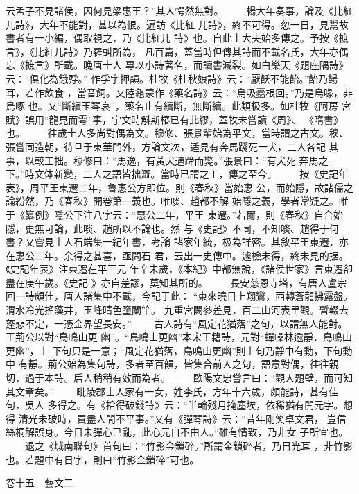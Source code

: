 \documentclass{ctexart}
\begin{document}
云孟子不見諸侯，因何見梁惠王？''其人愕然無對。 　　楊大年奏事，論及《比紅儿詩》，大年不能對，甚以為恨。遍訪《比紅 儿詩》，終不可得。忽一日，見鬻故書者有一小編，偶取視之，乃《比紅儿 詩》也。自此士大夫始多傳之。予按《摭言》，《比紅儿詩》乃羅虯所為， 凡百篇，蓋當時但傳其詩而不載名氏，大年亦偶忘《摭言》所載。晚唐士人 專以小詩著名，而讀書滅裂。如白樂天《題座隅詩》云：``俱化為餓殍。'' 作孚字押韻。杜牧《杜秋娘詩》云：``厭飫不能飴。''飴乃餳耳，若作飲食 ，當音飼。又陸龜蒙作《藥名詩》云：``烏吸蠹根回。''乃是烏喙，非烏啄 也。又``斷續玉琴哀''，藥名止有續斷，無斷續。此類极多。如杜牧《阿房 宮賦》誤用``龍見而雩''事，宇文時斛斯椿已有此繆，蓋牧未嘗讀《周》、 《隋書》也。 　　往歲士人多尚對偶為文。穆修、張景輩始為平文，當時謂之古文。穆、 張嘗同造朝，待旦于東華門外，方論文次，适見有奔馬踐死一犬，二人各記 其事，以較工拙。穆修曰：``馬逸，有黃犬遇蹄而斃。''張景曰：``有犬死 奔馬之下。''時文体新變，二人之語皆拙澀。當時已謂之工，傳之至今。 　　按《史記年表》，周平王東遷二年，魯惠公方即位。則《春秋》當始惠 公，而始隱，故諸儒之論紛然，乃《春秋》開卷第一義也。唯啖、趙都不解 始隱之義，學者常疑之。唯于《纂例》隱公下注八字云：``惠公二年，平王 東遷。''若爾，則《春秋》自合始隱，更無可論，此啖、趙所以不論也。然 与《史記》不同，不知啖、趙得于何書？又嘗見士人石端集一紀年書，考論 諸家年統，极為詳密。其敘平王東遷，亦在惠公二年。余得之甚喜，亟問石 君，云出一史傳中。遽檢未得，終未見的据。《史記年表》注東遷在平王元 年辛未歲，《本紀》中都無說，《諸侯世家》言東遷卻盡在庚午歲。《史記 》亦自差謬，莫知其所的。 　　長安慈恩寺塔，有唐人盧宗回一詩頗佳，唐人諸集中不載，今記于此： ``東來曉日上翔鸞，西轉蒼龍拂露盤。渭水冷光搖藻井，玉峰晴色墮闌竿。 九重宮闕參差見，百二山河表里觀。暫輟去蓬悲不定，一憑金界望長安。'' 　　古人詩有``風定花猶落''之句，以謂無人能對。王荊公以對``鳥鳴山更 幽''。``鳥鳴山更幽''本宋王籍詩，元對``蟬噪林逾靜，鳥鳴山更幽''，上 下句只是一意；``風定花猶落，鳥鳴山更幽''則上句乃靜中有動，下句動中 有靜。荊公始為集句詩，多者至百韻，皆集合前人之句，語意對偶，往往親 切，過于本詩。后人稍稍有效而為者。 　　歐陽文忠嘗言曰：``觀人題壁，而可知其文章矣。'' 　　毗陵郡士人家有一女，姓李氏，方年十六歲，頗能詩，甚有佳句，吳人 多得之。有《拾得破錢詩》云：``半輪殘月掩塵埃，依稀猶有開元字。想得 清光未破時，買盡人間不平事。''又有《彈琴詩》云：``昔年剛笑卓文君， 豈信絲桐解誤身。今日未彈心已亂，此心元自不由人。''雖有情致，乃非女 子所宜也。 　　退之《城南聯句》首句曰：``竹影金鎖碎。''所謂金鎖碎者，乃日光耳 ，非竹影也。若題中有日字，則曰``竹影金鎖碎''可也。

卷十五　藝文二
\end{document}
